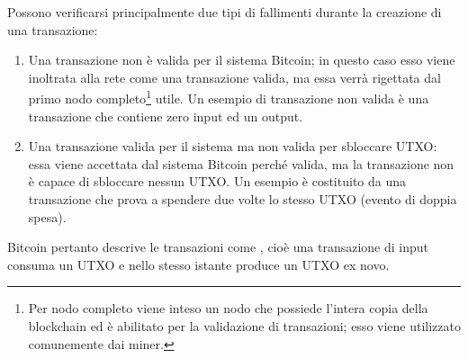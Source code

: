 Possono verificarsi principalmente due tipi di fallimenti durante la creazione di una transazione:
\begin{enumerate}
  \item Una transazione non è valida per il sistema Bitcoin; in questo caso esso viene inoltrata alla rete come una transazione valida, ma essa verrà rigettata dal primo nodo completo\footnote{Per nodo completo viene inteso un nodo che possiede l’intera copia della blockchain ed è abilitato per la validazione di transazioni; esso viene utilizzato comunemente dai miner.} utile. Un esempio di transazione non valida è una transazione che contiene zero input ed un output.
  \item Una transazione valida per il sistema ma non valida per sbloccare UTXO: essa viene accettata dal sistema Bitcoin perché valida, ma la transazione non è capace di sbloccare nessun UTXO. Un esempio è costituito da  una transazione che prova a spendere due volte lo stesso UTXO (evento di doppia spesa).
\end{enumerate}
Bitcoin pertanto descrive le transazioni come , cioè una transazione di input consuma un UTXO e nello stesso istante produce un UTXO ex novo.
